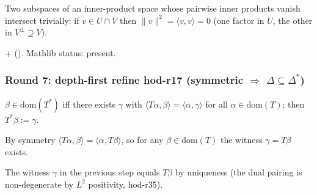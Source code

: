 \begin{lemma}
\label{lem:hod-r29}
Two subspaces of an inner-product space whose pairwise inner products vanish intersect trivially: if $v\in U\cap V$ then $\|v\|^{2} = \langle v,v\rangle = 0$ (one factor in $U$, the other in $V^{\perp}\supseteq V$).
\leanok\mathlibok
\end{lemma}

\begin{lemma}
\label{lem:hod-r30}
 +  ().  Mathlib status: present.
\leanok\mathlibok
\end{lemma}

\subsubsection*{Round 7: depth-first refine hod-r17 (symmetric $\Rightarrow$ $\Delta\subseteq\Delta^{*}$)}

\begin{lemma}
\label{lem:hod-r31}
$\beta\in\mathrm{dom}(T^{*})$ iff there exists $\gamma$ with $\langle T\alpha,\beta\rangle = \langle\alpha,\gamma\rangle$ for all $\alpha\in\mathrm{dom}(T)$; then $T^{*}\beta := \gamma$.
\leanok
\end{lemma}

\begin{lemma}
\label{lem:hod-r32}
By symmetry $\langle T\alpha,\beta\rangle = \langle\alpha,T\beta\rangle$, so for any $\beta\in\mathrm{dom}(T)$ the witness $\gamma=T\beta$ exists.
\leanok
\end{lemma}

\begin{lemma}[Pass hod.33: $T^{*}|_{\mathrm{dom}(T)} = T$]
\label{lem:hod-r33}
The witness $\gamma$ in the previous step equals $T\beta$ by uniqueness (the dual pairing is non-degenerate by $L^2$ positivity, hod-r35).
\leanok
\end{lemma}

